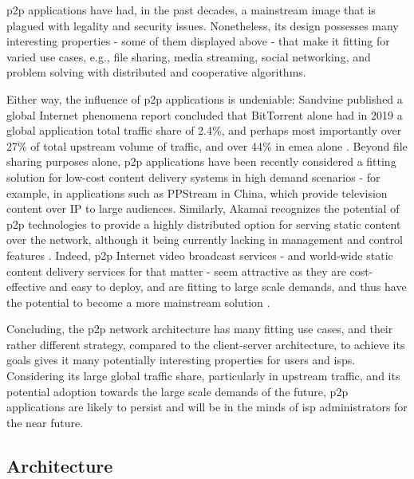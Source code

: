     \gls{p2p} applications have had, in the past decades, a mainstream image that is plagued with legality and security issues.
    Nonetheless, its design possesses many interesting properties - some of them displayed above - that make it fitting for varied use cases, e.g., file sharing, media streaming, social networking, and problem solving with distributed and cooperative algorithms.

    Either way, the influence of \gls{p2p} applications is undeniable: Sandvine \cite{sandvine} published a global Internet phenomena report concluded that BitTorrent \cite{bittorrent} alone had in 2019 a global application total traffic share of 2.4\%, and perhaps most importantly over 27\% of total upstream volume of traffic, and over 44\% in \gls{emea} alone \cite{sandvine2019}.
    Beyond file sharing purposes alone, \gls{p2p} applications have been recently considered a fitting solution for low-cost content delivery systems in high demand scenarios - for example, in applications such as PPStream \cite{ppstream} in China, which provide television content over IP to large audiences.
    Similarly, Akamai \cite{akamai} recognizes the potential of \gls{p2p} technologies to provide a highly distributed option for serving static content over the network, although it being currently lacking in management and control features \cite{akamai-report}.
    Indeed, \gls{p2p} Internet video broadcast services - and world-wide static content delivery services for that matter - seem attractive as they are cost-effective and easy to deploy, and are fitting to large scale demands, and thus have the potential to become a more mainstream solution \cite{jiangchuanliu2008}.

    Concluding, the \gls{p2p} network architecture has many fitting use cases, and their rather different strategy, compared to the client-server architecture, to achieve its goals gives it many potentially interesting properties for users and \glspl{isp}.
    Considering its large global traffic share, particularly in upstream traffic, and its potential adoption towards the large scale demands of the future, \gls{p2p} applications are likely to persist and will be in the minds of \gls{isp} administrators for the near future.

\subsection{Architecture}

